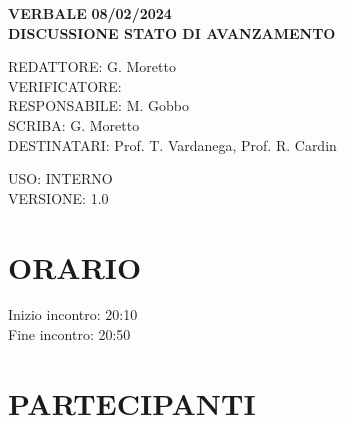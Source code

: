 \documentclass[5pt]{article}
\begin{document}
	\vspace{20pt}
	
	\begin{center}
		\textbf{\large VERBALE }
		\textbf{\large 08/02/2024} \\
		\textbf{\LARGE DISCUSSIONE STATO DI AVANZAMENTO}
	\end{center}
	
	\vspace{13pt}
	
	\begin{flushleft}
		\begin{spacing}{1.5}
			REDATTORE: G. Moretto\\%
			VERIFICATORE: \\%
			RESPONSABILE: M. Gobbo\\%
			\vspace{7pt}
			SCRIBA:  G. Moretto\\%
			\vspace{7pt}
			DESTINATARI:   Prof. T. Vardanega, Prof. R. Cardin\\%
		\end{spacing}
	\end{flushleft}
	
	\begin{flushright}
		\begin{spacing}{1}
			USO: INTERNO\\
			VERSIONE: 1.0\\
		\end{spacing}
	\end{flushright}
	
	
	\restoregeometry
	
	\pagebreak
	
	
	\section{ORARIO}
	\begin{spacing}{1.5}
		{\large Inizio incontro: 20:10}\\
		{\large Fine incontro: 20:50}
	\end{spacing}
	
	\section{PARTECIPANTI}
	\setlength\cellspacetoplimit{6pt}
	\setlength\cellspacebottomlimit{6pt}
	
\end{document}
